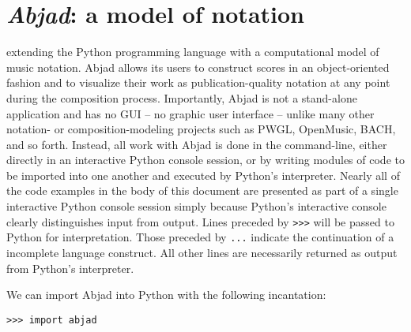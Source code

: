 \chapter{\emph{Abjad}: a model of notation}
\label{chap:a-model-of-notation}

 extending the Python
programming language with a computational model of music notation. Abjad allows
its users to construct scores in an object-oriented fashion and to visualize
their work as publication-quality notation at any point during the composition
process. Importantly, Abjad is not a stand-alone application and has no GUI --
no graphic user interface -- unlike many other notation- or
composition-modeling projects such as PWGL\cite{laurson2009qf,
kuuskankare2004recent}, OpenMusic\cite{assayag1999sw},
BACH\cite{agostini2013real}, and so forth. Instead, all work with Abjad is done
in the command-line, either directly in an interactive Python console session,
or by writing modules of code to be imported into one another and executed by
Python's interpreter. Nearly all of the code examples in the body of this
document are presented as part of a single interactive Python console session
simply because Python's interactive console clearly distinguishes input from
output. Lines preceded by \texttt{>>>} will be passed to Python for
interpretation. Those preceded by \texttt{...} indicate the continuation of a
incomplete language construct. All other lines are necessarily returned as
output from Python's interpreter.



We can import Abjad into Python with the following incantation:

\begin{comment}
<abjad>
import abjad
</abjad>
\end{comment}

\begin{abjadbookoutput}
\begin{singlespacing}
\vspace{-0.5\baselineskip}
\begin{verbatim}
>>> import abjad
\end{verbatim}
\end{singlespacing}
\end{abjadbookoutput}

